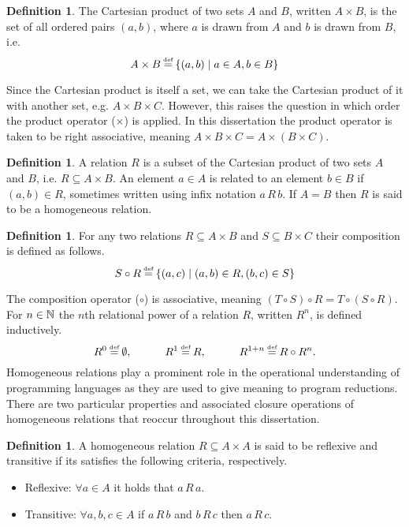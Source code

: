 \documentclass[12pt,phd,lfcs,twoside,openright,logo,leftchapter,normalheadings]{infthesis}
\theoremstyle{plain}
\theoremstyle{definition}
\newtheorem{definition}[theorem]{Definition}
\begin{document}
\begin{definition}
  The Cartesian product of two sets $A$ and $B$, written $A \times B$,
  is the set of all ordered pairs $(a, b)$, where $a$ is drawn from
  $A$ and $b$ is drawn from $B$, i.e.
  \[
    A \times B \defas \{ (a, b) \mid a \in A, b \in B \}
  \]
\end{definition}
%
Since the Cartesian product is itself a set, we can take the Cartesian
product of it with another set, e.g. $A \times B \times C$. However,
this raises the question in which order the product operator
($\times$) is applied. In this dissertation the product operator is
taken to be right associative, meaning
$A \times B \times C = A \times (B \times C)$.
%
%
%


\begin{definition}
  A relation $R$ is a subset of the Cartesian product of two sets $A$
  and $B$, i.e. $R \subseteq A \times B$.
  An element $a \in A$ is related to an element $b \in B$ if
  $(a, b) \in R$, sometimes written using infix notation $a\,R\,b$.
  If $A = B$ then $R$ is said to be a homogeneous relation.
\end{definition}
%

\begin{definition}
  For any two relations $R \subseteq A \times B$ and
  $S \subseteq B \times C$ their composition is defined as follows.
  \[
    S \circ R \defas \{ (a,c) \mid (a,b) \in R, (b, c) \in S \}
  \]
\end{definition}

The composition operator ($\circ$) is associative, meaning
$(T \circ S) \circ R = T \circ (S \circ R)$.
%
For $n \in \mathbb{N}$ the $n$th relational power of a relation $R$, written
$R^n$, is defined inductively.
\[
  R^0 \defas \emptyset, \quad\qquad R^1 \defas R, \quad\qquad R^{1 + n} \defas R \circ R^n.
\]
%
Homogeneous relations play a prominent role in the operational
understanding of programming languages as they are used to give
meaning to program reductions. There are two particular properties and
associated closure operations of homogeneous relations that reoccur
throughout this dissertation.
%
\begin{definition}
  A homogeneous relation $R \subseteq A \times A$ is said to be
  reflexive and transitive if its satisfies the following criteria,
  respectively.
  \begin{itemize}
    \item Reflexive: $\forall a \in A$ it holds that $a\,R\,a$.
    \item Transitive: $\forall a,b,c \in A$ if $a\,R\,b$ and $b\,R\,c$
      then $a\,R\,c$.
  \end{itemize}
\end{definition}
\end{document}
